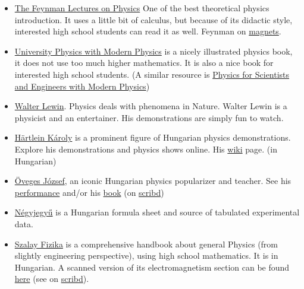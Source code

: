 \documentclass{article}
\begin{document}
\begin{itemize}

\item \href{https://www.feynmanlectures.caltech.edu/}{The Feynman Lectures on Physics} One of the best theoretical physics introduction. It uses a little bit of calculus, but because of its didactic style, interested  high school students can read it as well. Feynman on \href{https://www.youtube.com/watch?v=MO0r930Sn_8}{magnets}.

\item \href{https://github.com/sonhuytran/MIT8.01SC.2010F/blob/master/References/University\%20Physics\%20with\%20Modern\%20Physics\%2C\%2013th\%20Edition.pdf}{University Physics with Modern Physics} is a nicely illustrated physics book, it does not use too much higher mathematics. It is also a nice book for interested high school students. (A similar resource is \href{https://powerunit-ju.com/wp-content/uploads/2019/01/Physics-Textbook-9th-E-GearTeam-ilovepdf-compressed.pdf}{Physics for Scientists and Engineers with Modern Physics})

\item \href{https://www.youtube.com/channel/UCiEHVhv0SBMpP75JbzJShqw}{Walter Lewin}. Physics deals with phenomena in Nature. Walter Lewin is a physicist and an entertainer. His demonstrations are simply fun to watch. 

\item \href{http://goliat.eik.bme.hu/~hartlein/}{Härtlein Károly} is a prominent figure of Hungarian physics demonstrations. Explore his demonstrations and physics shows online. His \href{https://hu.wikipedia.org/wiki/H\%C3\%A4rtlein_K\%C3\%A1roly}{wiki} page. (in Hungarian)

\item \href{https://hu.wikipedia.org/wiki/\%C3\%96veges_J\%C3\%B3zsef}{Öveges József}, an iconic Hungarian physics popularizer and teacher. See his \href{https://videakid.hu/videok/termeszet/oveges-professzor-legkedvesebb-kiserleteim-1968-88kk7GyIYkqKKGph}{performance} and/or his \href{https://moly.hu/konyvek/oveges-jozsef-kiserletek-konyve}{book} (on \href{https://www.scribd.com/document/352980511/Oveges-Jozsef-Kiserletek-Konyve-1960}{scribd})

\item \href{https://www.scribd.com/doc/30863917/Negyjegy\%C5\%B1-fuggvenytablazatok}{Négyjegyű} is a Hungarian formula sheet and source of tabulated experimental data.

\item \href{https://en.mandadb.hu/tetel/357528/Fizika}{Szalay Fizika} is a comprehensive handbook about general Physics (from slightly engineering perspective), using high school mathematics. It is in Hungarian. A scanned version of its electromagnetism section can be found \href{https://web.archive.org/web/20200317111146/http://users.atw.hu/gepesz-lev/4felev/fizika.pdf}{here} (see on \href{https://www.scribd.com/document/492897465/Szalay-Fizika}{scribd}).


\end{itemize}
\end{document}
